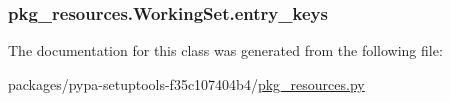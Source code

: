 \subsubsection[{entry\+\_\+keys}]{\setlength{\rightskip}{0pt plus 5cm}pkg\+\_\+resources.\+Working\+Set.\+entry\+\_\+keys}\label{classpkg__resources_1_1WorkingSet_afe054ebd8bc27fe61aa90cecadaa9bad}


The documentation for this class was generated from the following file\+:\begin{DoxyCompactItemize}
\item 
packages/pypa-\/setuptools-\/f35c107404b4/\hyperlink{pkg__resources_8py}{pkg\+\_\+resources.\+py}\end{DoxyCompactItemize}
